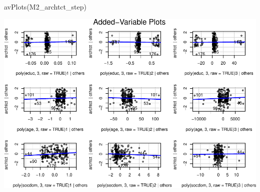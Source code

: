 \documentclass[
]{article}
\newenvironment{Shaded}{\begin{snugshade}}{\end{snugshade}}
\newcommand{\FunctionTok}[1]{\textcolor[rgb]{0.00,0.00,0.00}{#1}}
\newcommand{\NormalTok}[1]{#1}
\begin{document}
\begin{Shaded}
\begin{Highlighting}[]
\FunctionTok{avPlots}\NormalTok{(M2\_archtct\_step)}
\end{Highlighting}
\end{Shaded}

\includegraphics{HW5-Trinath-Sai-Subhash-Reddy-Pittala_files/figure-latex/unnamed-chunk-23-2.pdf}
\end{document}
